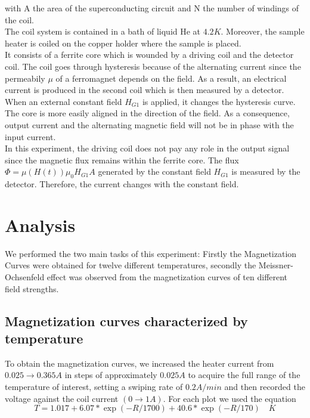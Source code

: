 \documentclass[openany,11pt,a4paper]{report}
\begin{document}
with A the area of the superconducting circuit and N the number of windings of the coil.\\

The coil system is contained in a bath of liquid He at $4.2K$. Moreover, the sample heater is coiled on the copper holder where the sample is placed. \\
 It consists of a ferrite core which is wounded by a driving coil and the detector coil. The coil goes through hysteresis because of the alternating current since the permeabily $\mu$ of a ferromagnet depends on the field. As a result, an electrical current is produced in the second coil which is then measured by a detector. When an external constant field $H_{G1}$ is applied, it changes the hysteresis curve. The core is more easily aligned in the direction of the field. As a consequence, output current and the alternating magnetic field will not be in phase with the input current.\\
In this experiment, the driving coil does not pay any role in the output signal since the magnetic flux remains within the ferrite core. The flux $\Phi=\mu(H(t)) \mu_{0} H_{G 1} A$ generated by the constant field $H_{G1}$ is measured by the detector. Therefore, the current changes with the constant field. 


















\chapter{Analysis}

We performed the two main tasks of this experiment: Firstly the Magnetization Curves were obtained for twelve different temperatures, secondly the Meissner-Ochsenfeld effect was observed from the magnetization curves of ten different field strengths.



 
 
\section{Magnetization curves characterized by temperature} 
To obtain the magnetization curves, we increased the heater current from $0.025 \rightarrow 0.365 A$ in steps of approximately $0.025A$ to acquire the full range of the temperature of interest, setting a swiping rate of $0.2 A/min$ and then recorded the voltage against the coil current $(0 \rightarrow 1A)$. For each plot we used the equation \begin{equation}
T=1.017+6.07 * \exp (-R / 1700)+40.6 * \exp (-R / 170)  \quad
 K
\end{equation}
\end{document}
